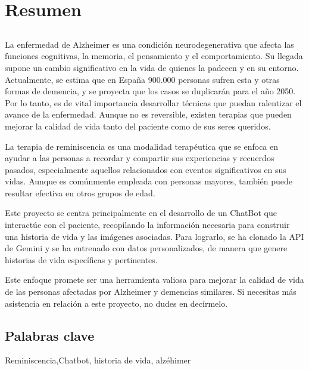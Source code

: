 \chapter*{Resumen}
\section*{\tituloPortadaVal}
La enfermedad de Alzheimer es una condición neurodegenerativa que afecta las funciones cognitivas, la memoria, el pensamiento y el comportamiento. Su llegada supone un cambio significativo en la vida de quienes la padecen y en su entorno. Actualmente, se estima que en España 900.000 personas sufren esta y otras formas de demencia, y se proyecta que los casos se duplicarán para el año 2050. Por lo tanto, es de vital importancia desarrollar técnicas que puedan ralentizar el avance de la enfermedad. Aunque no es reversible, existen terapias que pueden mejorar la calidad de vida tanto del paciente como de sus seres queridos.

La terapia de reminiscencia es una modalidad terapéutica que se enfoca en ayudar a las personas a recordar y compartir sus experiencias y recuerdos pasados, especialmente aquellos relacionados con eventos significativos en sus vidas. Aunque es comúnmente empleada con personas mayores, también puede resultar efectiva en otros grupos de edad.

Este proyecto se centra principalmente en el desarrollo de un ChatBot que interactúe con el paciente, recopilando la información necesaria para construir una historia de vida y las imágenes asociadas. Para lograrlo, se ha clonado la API de Gemini y se ha entrenado con datos personalizados, de manera que genere historias de vida específicas y pertinentes.

Este enfoque promete ser una herramienta valiosa para mejorar la calidad de vida de las personas afectadas por Alzheimer y demencias similares. Si necesitas más asistencia en relación a este proyecto, no dudes en decírmelo. 


\section*{Palabras clave}
   
\noindent Reminiscencia,Chatbot, historia de vida, alzéhimer

   



